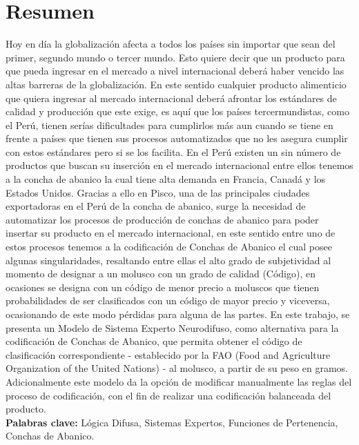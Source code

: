 \documentclass[12pt,oneside,a4paper]{book}
\begin{document}
\chapter*{Resumen}
Hoy en día la globalización afecta a todos los países sin importar que sean del primer, segundo mundo o tercer mundo. Esto quiere decir que un producto para que pueda ingresar en el mercado a nivel internacional deberá haber vencido las altas barreras de la globalización. En este sentido cualquier producto alimenticio que quiera ingresar al mercado internacional deberá afrontar los estándares de calidad y producción que este exige, es aquí que los países tercermundistas, como el Perú, tienen serías dificultades para cumplirlos más aun cuando se tiene en frente a países que tienen sus procesos automatizados que no les asegura cumplir con estos estándares pero si se los facilita. En el Perú existen un sin número de productos que buscan su inserción en el mercado internacional entre ellos tenemos a la concha de abanico la cual tiene alta demanda en Francia, Canadá y los Estados Unidos. Gracias a ello en Pisco, una de las principales ciudades exportadoras en el Perú de la concha de abanico, surge la necesidad de automatizar los procesos de producción de conchas de abanico para poder insertar su producto en el mercado internacional, en este sentido entre uno de estos procesos tenemos a la codificación de Conchas de Abanico el cual posee algunas singularidades, resaltando entre ellas el alto grado de subjetividad al momento de designar a un molusco con un grado de calidad (Código), en ocasiones se designa con un código de menor precio a moluscos que tienen probabilidades de ser clasificados con un código de mayor precio y viceversa, ocasionando de este modo pérdidas para alguna de las partes. En este trabajo, se presenta un Modelo de Sistema Experto Neurodifuso, como alternativa para la codificación de Conchas de Abanico, que permita obtener el código de clasificación correspondiente - establecido por la FAO (Food and Agriculture Organization of the United Nations) - al molusco, a partir de su peso en gramos. Adicionalmente este modelo da la opción de modificar manualmente las reglas del proceso de codificación, con el fin de realizar una codificación balanceada del producto. \\
\noindent \textbf{Palabras clave:} Lógica Difusa, Sistemas Expertos, Funciones de Pertenencia, Conchas de Abanico.

% 
  
\end{document}
